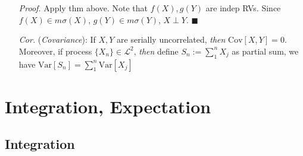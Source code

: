 \documentclass[a4paper,12pt,twoside]{book}
\begin{document}
\begin{itemize}
	\item[\textit{Proof.}] Apply thm above. Note that $f(X), g(Y)$ are indep RVs. Since $f(X)\in m \sigma(X)$, $g(Y) \in m \sigma(Y)$, $X\perp Y$. $\blacksquare$

	\item[\textit{Cor.}] (\textit{Covariance}): If $X,Y$ are serially uncorrelated, \textit{then} $\mathrm{Cov}\left[X,Y\right]=0$. Moreover, if process $\{X_n\}\in \mathcal{L}^2$, \textit{then} define $S_n:=\sum_1^n X_j$ as partial sum, we have $\mathrm{Var}\left[S_n\right]=\sum_1^n \mathrm{Var}\left[X_j\right]$
\end{itemize}

\chapter{Integration, Expectation}

\section{Integration}

\end{document}
